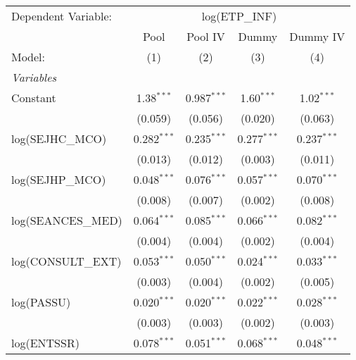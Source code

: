 
\begingroup
\centering
\begin{tabular}{lcccc}
   \tabularnewline \midrule \midrule
   Dependent Variable: & \multicolumn{4}{c}{log(ETP\_INF)}                                                  \\
                       & Pool                              & Pool IV       & Dummy          & Dummy IV      \\
   Model:              & (1)                               & (2)           & (3)            & (4)           \\
   \midrule
   \emph{Variables}                                                                                         \\
   Constant            & 1.38$^{***}$                      & 0.987$^{***}$ & 1.60$^{***}$   & 1.02$^{***}$  \\
                       & (0.059)                           & (0.056)       & (0.020)        & (0.063)       \\
   log(SEJHC\_MCO)     & 0.282$^{***}$                     & 0.235$^{***}$ & 0.277$^{***}$  & 0.237$^{***}$ \\
                       & (0.013)                           & (0.012)       & (0.003)        & (0.011)       \\
   log(SEJHP\_MCO)     & 0.048$^{***}$                     & 0.076$^{***}$ & 0.057$^{***}$  & 0.070$^{***}$ \\
                       & (0.008)                           & (0.007)       & (0.002)        & (0.008)       \\
   log(SEANCES\_MED)   & 0.064$^{***}$                     & 0.085$^{***}$ & 0.066$^{***}$  & 0.082$^{***}$ \\
                       & (0.004)                           & (0.004)       & (0.002)        & (0.004)       \\
   log(CONSULT\_EXT)   & 0.053$^{***}$                     & 0.050$^{***}$ & 0.024$^{***}$  & 0.033$^{***}$ \\
                       & (0.003)                           & (0.004)       & (0.002)        & (0.005)       \\
   log(PASSU)          & 0.020$^{***}$                     & 0.020$^{***}$ & 0.022$^{***}$  & 0.028$^{***}$ \\
                       & (0.003)                           & (0.003)       & (0.002)        & (0.003)       \\
   log(ENTSSR)         & 0.078$^{***}$                     & 0.051$^{***}$ & 0.068$^{***}$  & 0.048$^{***}$ \\

\end{tabular}
